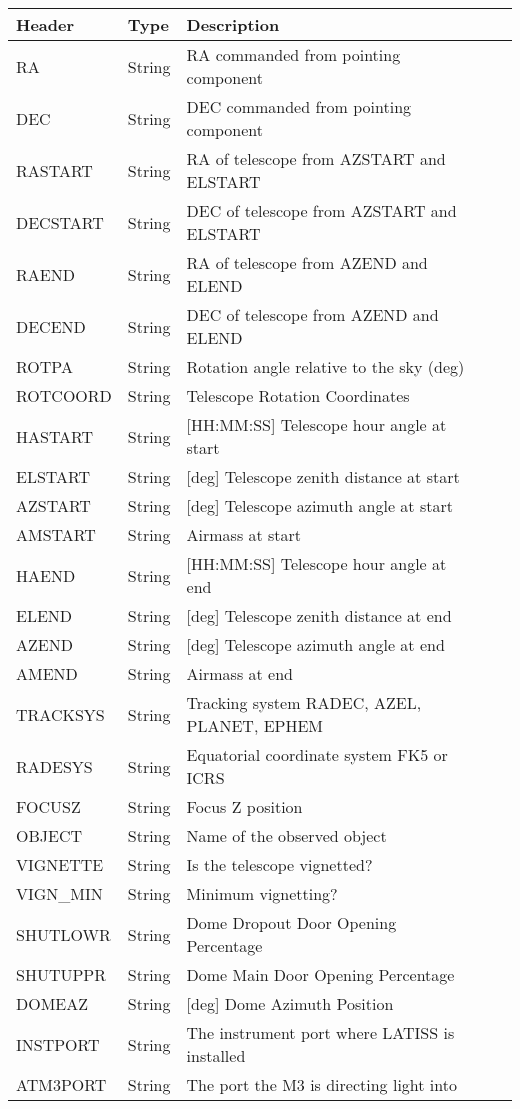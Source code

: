 \begin{tabular}{l l l l l}
\hline
Header & Type & Description \\
\hline
RA & String & RA commanded from pointing component \\
DEC & String & DEC commanded from pointing component \\
RASTART & String & RA of telescope from AZSTART and ELSTART \\
DECSTART & String & DEC of telescope from AZSTART and ELSTART \\
RAEND & String & RA of telescope from AZEND and ELEND \\
DECEND & String & DEC of telescope from AZEND and ELEND \\
ROTPA & String & Rotation angle relative to the sky (deg) \\
ROTCOORD & String & Telescope Rotation Coordinates \\
HASTART & String & [HH:MM:SS] Telescope hour angle at start \\
ELSTART & String & [deg] Telescope zenith distance at start \\
AZSTART & String & [deg] Telescope azimuth angle at start \\
AMSTART & String & Airmass at start \\
HAEND & String & [HH:MM:SS] Telescope hour angle at end \\
ELEND & String & [deg] Telescope zenith distance at end \\
AZEND & String & [deg] Telescope azimuth angle at end \\
AMEND & String & Airmass at end \\
TRACKSYS & String & Tracking system RADEC, AZEL, PLANET, EPHEM \\
RADESYS & String & Equatorial coordinate system FK5 or ICRS \\
FOCUSZ & String & Focus Z position \\
OBJECT & String & Name of the observed object \\
VIGNETTE & String & Is the telescope vignetted? \\
VIGN\_MIN & String & Minimum vignetting? \\
SHUTLOWR & String & Dome Dropout Door Opening Percentage \\
SHUTUPPR & String & Dome Main Door Opening Percentage \\
DOMEAZ & String & [deg] Dome Azimuth Position \\
INSTPORT & String & The instrument port where LATISS is installed \\
ATM3PORT & String & The port the M3 is directing light into \\
\hline
\end{tabular}


